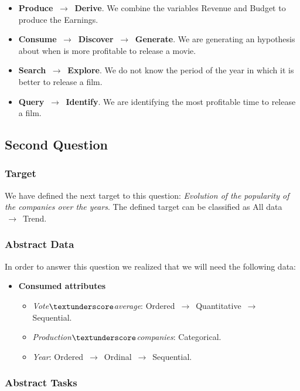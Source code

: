 \begin{itemize}
	\item \textbf{Produce $\,\to\,$ Derive}. We combine the variables Revenue and Budget to produce the Earnings.
	\item \textbf{Consume $\,\to\,$ Discover $\,\to\,$ Generate}. We are generating an hypothesis about when is more profitable to release a movie.
	\item \textbf{Search $\,\to\,$ Explore}. We do not know the period of the year in which it is better to release a film.
	\item \textbf{Query $\,\to\,$ Identify}. We are identifying the most profitable time to release a film.
\end{itemize}

\subsection{Second Question}

\subsubsection{Target}
We have defined the next target to this question: \textit{Evolution of the popularity of the companies over the years}. The defined target can be classified as All data $\,\to\,$ Trend.

\subsubsection{Abstract Data}

In order to answer this question we realized that we will need the following data:

\begin{itemize}
	\item \textbf{Consumed attributes}
		\begin{itemize}
			\item \textit{Vote$\textunderscore$average}: Ordered $\,\to\,$ Quantitative $\,\to\,$ Sequential.
			\item \textit{Production$\textunderscore$companies}: Categorical.
			\item \textit{Year}: Ordered $\,\to\,$ Ordinal $\,\to\,$ Sequential.
		\end{itemize}
\end{itemize}

\subsubsection{Abstract Tasks}

